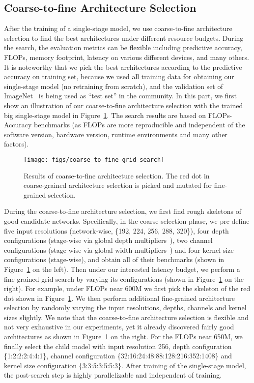 \documentclass[runningheads]{llncs}
\begin{document}
\subsection{Coarse-to-fine Architecture Selection}\label{secs:grid_search}

After the training of a single-stage model, we use coarse-to-fine architecture selection to find the best architectures under different resource budgets. During the search, the evaluation metrics can be flexible including predictive accuracy, FLOPs, memory footprint, latency on various different devices, and many others. It is noteworthy that we pick the best architectures according to the predictive accuracy on training set, because we used all training data for obtaining our single-stage model (no retraining from scratch), and the validation set of ImageNet~\cite{deng2009imagenet} is being used as ``test set'' in the community. In this part, we first show an illustration of our coarse-to-fine architecture selection with the trained big single-stage model in Figure~\ref{figs:grid_search}. The search results are based on FLOPs-Accuracy benchmarks (as FLOPs are more reproducible and independent of the software version, hardware version, runtime environments and many other factors).

\begin{figure}[ht]
\centering
\texttt{[image: figs/coarse\_to\_fine\_grid\_search]}
\caption{Results of coarse-to-fine architecture selection. The red dot in coarse-grained architecture selection is picked and mutated for fine-grained  selection.
}
\label{figs:grid_search}
\end{figure}

During the coarse-to-fine architecture selection, we first find rough skeletons of good candidate networks. Specifically, in the coarse selection phase, we pre-define five input resolutions (network-wise, {\tiny\{192, 224, 256, 288, 320\}}), four depth configurations (stage-wise via global depth multipliers~\cite{tan2019efficientnet}), two channel configurations (stage-wise via global width multipliers~\cite{howard2017mobilenets}) and four kernel size configurations (stage-wise), and obtain all of their benchmarks (shown in Figure~\ref{figs:grid_search} on the left). Then under our interested latency budget, we perform a fine-grained grid search by varying its configurations (shown in Figure~\ref{figs:grid_search} on the right). For example, under FLOPs near 600M we first pick the skeleton of the red dot shown in Figure~\ref{figs:grid_search}. We then perform additional fine-grained architecture selection by randomly varying the input resolutions, depths, channels and kernel sizes slightly. We note that the coarse-to-fine architecture selection is flexible and not very exhaustive in our experiments, yet it already discovered fairly good architectures as shown in Figure~\ref{figs:grid_search} on the right. For the FLOPs near 650M, we finally select the child model with input resolution 256, depth configuration {\tiny\{1:2:2:2:4:4:1\}}, channel configuration {\tiny\{32:16:24:48:88:128:216:352:1408\}} and kernel size configuration {\tiny\{3:3:5:3:5:5:3\}}. After training of the single-stage model, the post-search step is highly parallelizable and independent of training. 
\end{document}

